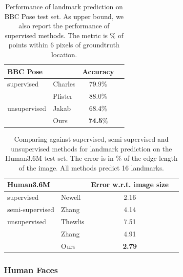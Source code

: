 		\begin{table}[t]
			\caption{{
			Performance of landmark prediction on BBC Pose test set. As upper bound, we also report the performance of supervised methods.
			The metric is \% of points within 6 pixels of groundtruth location. %
			}}
			\label{tab:bbcpose}
			\centering
			\begin{tabular}{ll|cr}
			\hline
			BBC Pose &   &    { Accuracy}  \\
			 \hline
			supervised & Charles \cite{Charles:2013tb} &
			   79.9\%  \\ %
			 & Pfister \cite{Pfister:2015uo}  &
			  88.0\%  \\ \hline %
			unsupervised &Jakab \cite{Jakab:2018wc} &
			 68.4\%  \\  %
			  &Ours &  \textbf{74.5}\% \\
			\hline
			\end{tabular}
		\end{table}
		\begin{table}[t]
			\caption{{Comparing against supervised, semi-supervised and unsupervised methods for landmark prediction on the Human3.6M test set. The
			error is in \% of the edge length of the image. All methods predict 16 landmarks.
			}}
			\label{tab:human}
			\centering
			\begin{tabular}{ll|cr}
			\hline
			 Human3.6M   & &  { Error w.r.t. image size}  \\
			 \hline
			 supervised & Newell \cite{Newell:2016vq}
			  &2.16  \\  \hline
			 semi-supervised & Zhang \cite{Zhang:2018vz}
			  & 4.14  \\ \hline
			 unsupervised & Thewlis \cite{Thewlis:2017wi}
			 & 7.51  \\
			  & Zhang \cite{Zhang:2018vz}
				& 4.91 \\
			  & Ours& \textbf{2.79} \\
			\hline
			\end{tabular}
		\end{table}

		\subsubsection{Human Faces}

